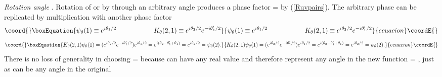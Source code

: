 \documentclass[a4paper,12pt]{article}
\begin{document}
	{\textit{Rotation angle}} \myHighlight{$\theta$}\coordHE{}. Rotation of \coordHE{} or \coordHE{} by \coordHE{} through an arbitrary angle \myHighlight{$\theta$}\coordHE{} produces a phase factor \myHighlight{$\psi_{\theta}$}\coordHE{} = \coordHE{} by (\ref{Ruvpairs}). The arbitrary phase can be replicated by multiplication with another phase factor \coordHE{} 
\begin{equation}\coord{}\boxEquation{  \label{psi,theta}
\psi_{\theta}(1) \equiv e^{i\theta_{1}/2} \hspace{2cm}
K_{\theta}(2,1) \equiv e^{i\theta_{2}/2 } e^{-i\theta_{1}^{\prime}/2}
}{  \psi_{\theta}(1) \equiv e^{i\theta_{1}/2} \hspace{2cm}
K_{\theta}(2,1) \equiv e^{i\theta_{2}/2 } e^{-i\theta_{1}^{\prime}/2}
}{ecuacion}\coordE{}\end{equation}
\begin{equation}\coord{}\boxEquation{  \label{Kpsi,theta}
K_{\theta}(2,1) \psi_{\theta}(1) = (e^{i\theta_{2}/2 } e^{-i\theta_{1}^{\prime}/2}) e^{i\theta_{1}/2}
=  e^{i(\theta_{2} - \theta_{1}^{\prime} + \theta_{1})} = e^{i\theta_{2}/2} = \psi_{\theta}(2).
}{  K_{\theta}(2,1) \psi_{\theta}(1) = (e^{i\theta_{2}/2 } e^{-i\theta_{1}^{\prime}/2}) e^{i\theta_{1}/2}
=  e^{i(\theta_{2} - \theta_{1}^{\prime} + \theta_{1})} = e^{i\theta_{2}/2} = \psi_{\theta}(2).
}{ecuacion}\coordE{}\end{equation} 
There is no loss of generality in choosing \coordHE{} = \coordHE{} because \coordHE{} can have any real value and therefore represent any angle in the new function \coordHE{} = \coordHE{}, just as \coordHE{} can be any angle in the original \coordHE{} 
\end{document}

